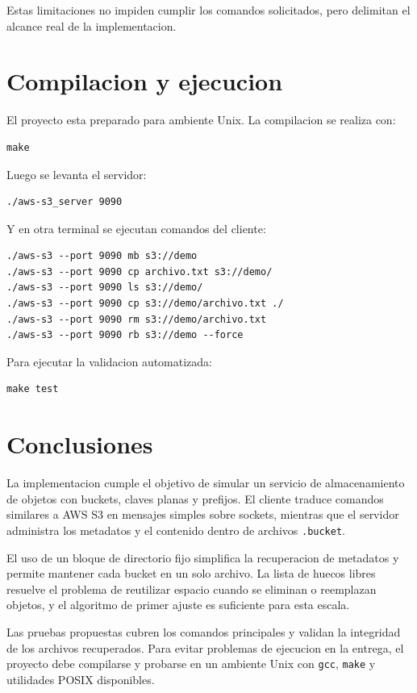 \documentclass[12pt,letterpaper]{article}
\begin{document}
Estas limitaciones no impiden cumplir los comandos solicitados, pero delimitan el alcance
real de la implementacion.

\section{Compilacion y ejecucion}

El proyecto esta preparado para ambiente Unix. La
compilacion se realiza con:

\begin{lstlisting}[style=console]
make
\end{lstlisting}

Luego se levanta el servidor:

\begin{lstlisting}[style=console]
./aws-s3_server 9090
\end{lstlisting}

Y en otra terminal se ejecutan comandos del cliente:

\begin{lstlisting}[style=console]
./aws-s3 --port 9090 mb s3://demo
./aws-s3 --port 9090 cp archivo.txt s3://demo/
./aws-s3 --port 9090 ls s3://demo/
./aws-s3 --port 9090 cp s3://demo/archivo.txt ./
./aws-s3 --port 9090 rm s3://demo/archivo.txt
./aws-s3 --port 9090 rb s3://demo --force
\end{lstlisting}

Para ejecutar la validacion automatizada:

\begin{lstlisting}[style=console]
make test
\end{lstlisting}

\section{Conclusiones}

La implementacion cumple el objetivo de simular un servicio de almacenamiento de
objetos con buckets, claves planas y prefijos. El cliente traduce comandos similares a
AWS S3 en mensajes simples sobre sockets, mientras que el servidor administra los
metadatos y el contenido dentro de archivos \texttt{.bucket}.

El uso de un bloque de directorio fijo simplifica la recuperacion de metadatos y permite
mantener cada bucket en un solo archivo. La lista de huecos libres resuelve el problema
de reutilizar espacio cuando se eliminan o reemplazan objetos, y el algoritmo de primer
ajuste es suficiente para esta escala.

Las pruebas propuestas cubren los comandos principales y validan la integridad de los
archivos recuperados. Para evitar problemas de ejecucion en la entrega, el proyecto debe
compilarse y probarse en un ambiente Unix con \texttt{gcc}, \texttt{make} y utilidades
POSIX disponibles.
\end{document}
